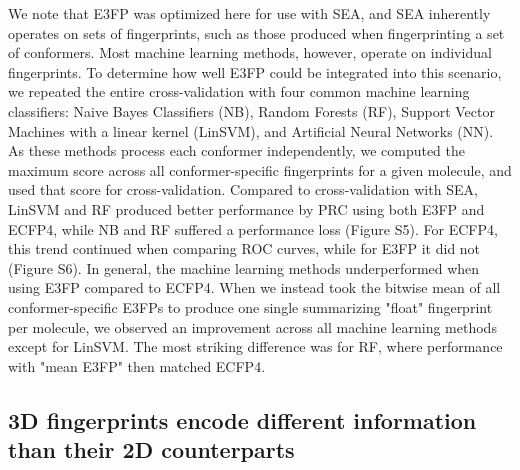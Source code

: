 \documentclass[../../main.tex]{subfiles}
\begin{document}
\begin{refsection}
	We note that E3FP was optimized here for use with SEA, and SEA inherently operates on sets of fingerprints, such as those produced when fingerprinting a set of conformers.
	Most machine learning methods, however, operate on individual fingerprints.
	To determine how well E3FP could be integrated into this scenario, we repeated the entire cross-validation with four common machine learning classifiers:
	Naive Bayes Classifiers (NB), Random Forests (RF), Support Vector Machines with a linear kernel (LinSVM), and Artificial Neural Networks  (NN).
	As these methods process each conformer independently, we computed the maximum score across all conformer-specific fingerprints for a given molecule, and used that score for cross-validation.
	Compared to cross-validation with SEA, LinSVM and RF produced better performance by PRC using both E3FP and ECFP4, while NB and RF suffered a performance loss (Figure S5).
	For ECFP4, this trend continued when comparing ROC curves, while for E3FP it did not (Figure S6).
	In general, the machine learning methods underperformed when using E3FP compared to ECFP4.
	When we instead took the bitwise mean of all conformer-specific E3FPs to produce one single summarizing "float"
	fingerprint per molecule, we observed an improvement across all machine learning methods except for LinSVM.
	The most striking difference was for RF, where performance with "mean E3FP" then matched ECFP4.

	\subsection*{3D fingerprints encode different information than their 2D counterparts}


\end{refsection}
\end{document}

